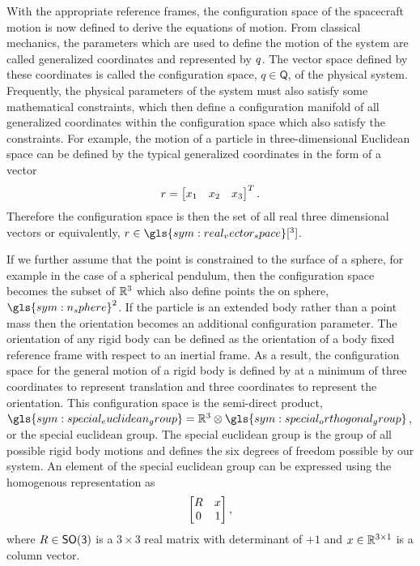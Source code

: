 With the appropriate reference frames, the configuration space of the spacecraft motion is now defined to derive the equations of motion.
From classical mechanics, the parameters which are used to define the motion of the system are called generalized coordinates and represented by \( q \).
The vector space defined by these coordinates is called the configuration space, \( q \in \mathsf{Q} \), of the physical system.
Frequently, the physical parameters of the system must also satisfy some mathematical constraints, which then define a configuration manifold of all generalized coordinates within the configuration space which also satisfy the constraints.
For example, the motion of a particle in three-dimensional Euclidean space can be defined by the typical generalized coordinates in the form of a vector
\begin{align*}
    r = \begin{bmatrix}
        x_1 & x_2 & x_3
    \end{bmatrix}^T.
\end{align*}
Therefore the configuration space is then the set of all real three dimensional vectors or equivalently, \(\vc{r} \in \gls{sym:real_vector_space}[^3]\).

If we further assume that the point is constrained to the surface of a sphere, for example in the case of a spherical pendulum, then the configuration space becomes the subset of \( \mathbb{R}^3 \) which also define points the on sphere, \( \gls{sym:n_sphere}^2 \).
If the particle is an extended body rather than a point mass then the orientation becomes an additional configuration parameter.
The orientation of any rigid body can be defined as the orientation of a body fixed reference frame with respect to an inertial frame. 
As a result, the configuration space for the general motion of a rigid body is defined by at a minimum of three coordinates to represent translation and three coordinates to represent the orientation.
This configuration space is the semi-direct product, \( \gls{sym:special_euclidean_group} = \R^3 \otimes \gls{sym:special_orthogonal_group} \), or the special euclidean group.
The special euclidean group is the group of all possible rigid body motions and defines the six degrees of freedom possible by our system.
An element of the special euclidean group can be expressed using the homogenous representation as
\begin{align*}
    \begin{bmatrix}
        R & x \\
        0 & 1
    \end{bmatrix},
\end{align*}
where \( R \in \mathsf{SO(3)}\) is a \( 3 \times 3 \) real matrix with determinant of \( +1\) and \( x \in \mathbb{R}^{3 \times 1}\) is a column vector.

